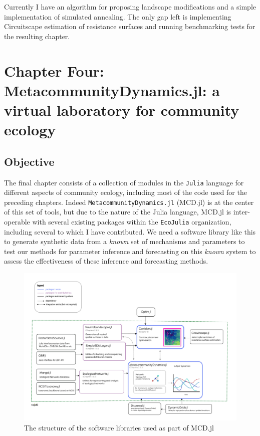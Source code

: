 \documentclass[11pt]{article}
\makeatletter
\def\maxwidth{\ifdim\Gin@nat@width>\linewidth\linewidth
\else\Gin@nat@width\fi}
\let\Oldincludegraphics\includegraphics
\renewcommand{\includegraphics}[1]{\Oldincludegraphics[width=\maxwidth]{#1}}
\makeatother
\begin{document}
Currently I have an algorithm for proposing landscape modifications and
a simple implementation of simulated annealing. The only gap left is
implementing Circuitscape estimation of resistance surfaces and running
benchmarking tests for the resulting chapter.

\hypertarget{chapter-four-metacommunitydynamics.jl-a-virtual-laboratory-for-community-ecology}{%
\section{Chapter Four: MetacommunityDynamics.jl: a virtual laboratory
for community
ecology}\label{chapter-four-metacommunitydynamics.jl-a-virtual-laboratory-for-community-ecology}}

\hypertarget{objective-3}{%
\subsection{Objective}\label{objective-3}}

The final chapter consists of a collection of modules in the
\texttt{Julia} language for different aspects of community ecology,
including most of the code used for the preceding chapters. Indeed
\texttt{MetacommunityDynamics.jl} (MCD.jl) is at the center of this set
of tools, but due to the nature of the Julia language, MCD.jl is
inter-operable with several existing packages within the
\texttt{EcoJulia} organization, including several to which I have
contributed. We need a software library like this to generate synthetic
data from a \emph{known} set of mechanisms and parameters to test our
methods for parameter inference and forecasting on this \emph{known}
system to assess the effectiveness of these inference and forecasting
methods.

\begin{figure}
\hypertarget{fig:software}{%
\centering
\includegraphics{./figures/ch4.png}
\caption{The structure of the software libraries used as part of
MCD.jl}\label{fig:software}
}
\end{figure}
\end{document}
